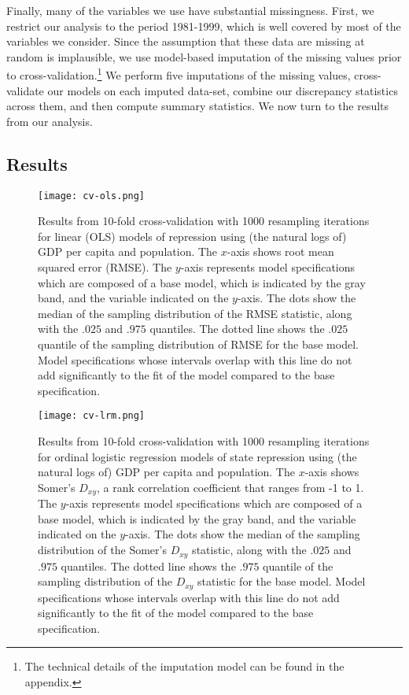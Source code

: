 \documentclass[11pt]{article}
\begin{document}
Finally, many of the variables we use have substantial missingness. First, we restrict our analysis to the period 1981-1999, which is well covered by most of the variables we consider. Since the assumption that these data are missing at random is implausible, we use model-based imputation of the missing values prior to cross-validation.\footnote{The technical details of the imputation model can be found in the appendix.} We perform five imputations of the missing values, cross-validate our models on each imputed data-set, combine our discrepancy statistics across them, and then compute summary statistics. We now turn to the results from our analysis.

\subsection{Results}

\begin{figure}[!htpb]
\centering
\texttt{[image: cv-ols.png]}
\caption{Results from 10-fold cross-validation with 1000 resampling iterations for linear (OLS) models of repression using (the natural logs of) GDP per capita and population. The $x$-axis shows root mean squared error (RMSE). The $y$-axis represents model specifications which are composed of a base model, which is indicated by the gray band, and the variable indicated on the $y$-axis. The dots show the median of the sampling distribution of the RMSE statistic, along with the $.025$ and $.975$ quantiles. The dotted line shows the $.025$ quantile of the sampling distribution of RMSE for the base model. Model specifications whose intervals overlap with this line do not add significantly to the fit of the model compared to the base specification.}
\label{fig:cv-ols}
\end{figure}

\begin{figure}[!htpb]
\centering
\texttt{[image: cv-lrm.png]}
\caption{Results from 10-fold cross-validation with 1000 resampling iterations for ordinal logistic regression models of state repression using (the natural logs of) GDP per capita and population. The $x$-axis shows Somer's $D_{xy}$, a rank correlation coefficient that ranges from -1 to 1. The $y$-axis represents model specifications which are composed of a base model, which is indicated by the gray band, and the variable indicated on the $y$-axis. The dots show the median of the sampling distribution of the Somer's $D_{xy}$ statistic, along with the $.025$ and $.975$ quantiles. The dotted line shows the $.975$ quantile of the sampling distribution of the $D_{xy}$ statistic for the base model. Model specifications whose intervals overlap with this line do not add significantly to the fit of the model compared to the base specification.}
\label{fig:cv-lrm}
\end{figure}
\end{document}
